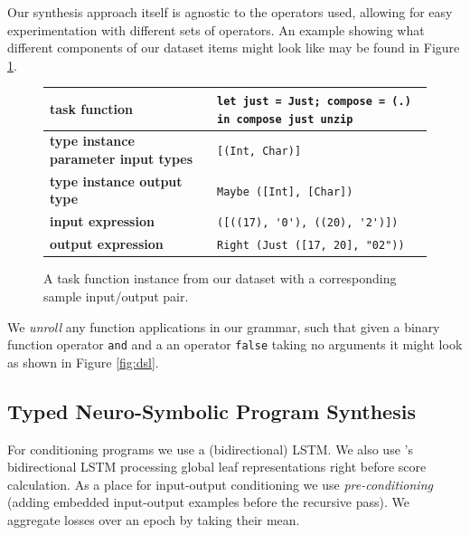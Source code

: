 \documentclass{article} %
\begin{document}
Our synthesis approach itself is agnostic to the operators used,
allowing for easy experimentation with different sets of operators.
%
An example showing what different components of our dataset items might look like may be found in Figure \ref{fig:datasample}.
%
\begin{figure}
    \begin{tabular}{|l|l|} \hline
        \textbf{task function} & \verb|let just = Just; compose = (.) in compose just unzip| \\ \hline
        \textbf{type instance parameter input types} & \verb|[(Int, Char)]| \\ \hline
        \textbf{type instance output type} & \verb|Maybe ([Int], [Char])| \\ \hline
        \textbf{input expression} & \verb|([((17), '0'), ((20), '2')])| \\ \hline
        \textbf{output expression} & \verb|Right (Just ([17, 20], "02"))| \\ \hline
    \end{tabular}
    \caption{A task function instance from our dataset with a corresponding sample input/output pair.}
    \label{fig:datasample}
\end{figure}
%
We \emph{unroll} any function applications in our grammar, such that given a binary function operator \verb|and| and a an operator \verb|false| taking no arguments it might look as shown in Figure \ref{fig:dsl}.

\subsection{Typed Neuro-Symbolic Program Synthesis}


For conditioning programs we use a (bidirectional) LSTM.
We also use \citet{nsps}'s bidirectional LSTM processing global leaf representations right before score calculation.
As a place for input-output conditioning we use \emph{pre-conditioning}
(adding embedded input-output examples before the recursive pass).
We aggregate losses over an epoch by taking their mean.
\end{document}
